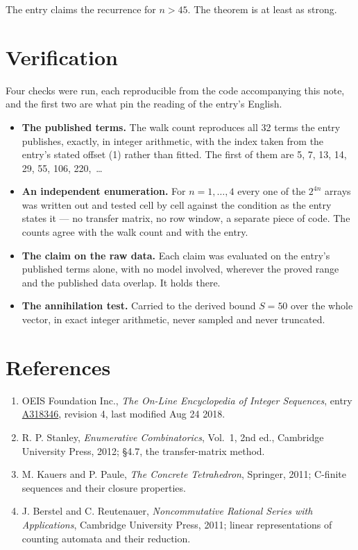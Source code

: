 \documentclass[11pt]{article}
\theoremstyle{definition}
\begin{document}
The entry claims the recurrence for $n > 45$. The theorem is at least as strong.

\section{Verification}

Four checks were run, each reproducible from the code accompanying this note, and the first two are what pin the reading of the entry's English.

\begin{itemize}

\item {\bfseries The published terms.} The walk count reproduces all 32 terms the entry publishes, exactly, in integer arithmetic, with the index taken from the entry's stated offset (1) rather than fitted. The first of them are 5, 7, 13, 14, 29, 55, 106, 220,~\dots

\item {\bfseries An independent enumeration.} For $n = 1,\dots,4$ every one of the $2^{4n}$ arrays was written out and tested cell by cell against the condition as the entry states it --- no transfer matrix, no row window, a separate piece of code. The counts agree with the walk count and with the entry.

\item {\bfseries The claim on the raw data.} Each claim was evaluated on the entry's published terms alone, with no model involved, wherever the proved range and the published data overlap. It holds there.

\item {\bfseries The annihilation test.} Carried to the derived bound $S = 50$ over the whole vector, in exact integer arithmetic, never sampled and never truncated.

\end{itemize}

\section{References}

\begin{enumerate}

\item OEIS Foundation Inc., \emph{The On-Line Encyclopedia of Integer Sequences}, entry \href{https://oeis.org/A318346}{A318346}, revision 4, last modified Aug 24 2018.

\item R. P. Stanley, \emph{Enumerative Combinatorics}, Vol.~1, 2nd ed., Cambridge University Press, 2012; \S4.7, the transfer-matrix method.

\item M. Kauers and P. Paule, \emph{The Concrete Tetrahedron}, Springer, 2011; C-finite sequences and their closure properties.

\item J. Berstel and C. Reutenauer, \emph{Noncommutative Rational Series with Applications}, Cambridge University Press, 2011; linear representations of counting automata and their reduction.

\end{enumerate}
\end{document}
